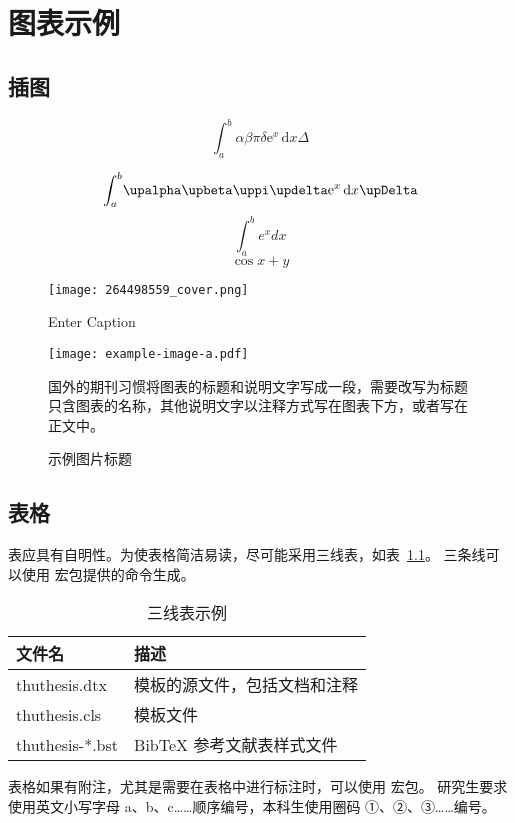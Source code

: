 
\chapter{图表示例}

\section{插图}

$$\int_a^b\!\alpha\beta\pi\delta\mathrm{e}^x\,\mathrm{d}x \Delta$$

$$\int_a^b\!\upalpha\upbeta\mpi\mdl\me^x\,\md x \upDelta$$
$$\int_a^b e^x dx$$
\[\cos x+y\]

\begin{figure}[!htbp]
    \centering
    \texttt{[image: 264498559\_cover.png]}
    \caption{Enter Caption}
    \label{fig:enter-label}
\end{figure}


\begin{figure}
  \centering
  \texttt{[image: example-image-a.pdf]}
  \caption*{国外的期刊习惯将图表的标题和说明文字写成一段，需要改写为标题只含图表的名称，其他说明文字以注释方式写在图表下方，或者写在正文中。}
  \caption{示例图片标题}
  \label{fig:example}
\end{figure}


\section{表格}

表应具有自明性。为使表格简洁易读，尽可能采用三线表，如表~\ref{tab:three-line}。
三条线可以使用  宏包提供的命令生成。

\begin{table}
  \centering
  \caption{三线表示例}
  \begin{tabular}{ll}
    \toprule
    文件名          & 描述                         \\
    \midrule
    thuthesis.dtx   & 模板的源文件，包括文档和注释 \\
    thuthesis.cls   & 模板文件                     \\
    thuthesis-*.bst & BibTeX 参考文献表样式文件    \\
    \bottomrule
  \end{tabular}
  \label{tab:three-line}
\end{table}

表格如果有附注，尤其是需要在表格中进行标注时，可以使用 宏包。
研究生要求使用英文小写字母 a、b、c……顺序编号，本科生使用圈码 ①、②、③……编号。

